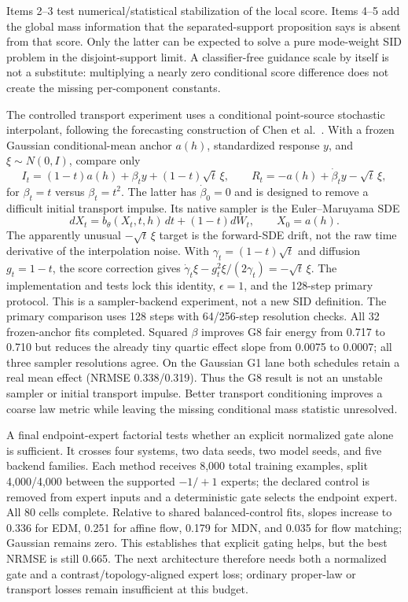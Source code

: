 \documentclass[10pt]{article}
\begin{document}
Items 2--3 test numerical/statistical stabilization of the local score.  Items
4--5 add the global mass information that the separated-support proposition says
is absent from that score.  Only the latter can be expected to solve a pure
mode-weight SID problem in the disjoint-support limit.  A classifier-free guidance
scale by itself is not a substitute: multiplying a nearly zero conditional score
difference does not create the missing per-component constants.

The controlled transport experiment uses a conditional point-source
stochastic interpolant, following the forecasting construction of Chen et
al.\ \cite{chen2024}.  With a frozen Gaussian conditional-mean anchor $a(h)$,
standardized response $y$, and $\xi\sim N(0,I)$, compare only
\[
 I_t=(1-t)a(h)+\beta_t y+(1-t)\sqrt t\,\xi,
 \qquad
 R_t=-a(h)+\dot\beta_t y-\sqrt t\,\xi,
\]
for $\beta_t=t$ versus $\beta_t=t^2$.  The latter has $\dot\beta_0=0$ and is
designed to remove a difficult initial transport impulse.  Its native sampler is
the Euler--Maruyama SDE
\[
 dX_t=b_\theta(X_t,t,h)\,dt+(1-t)dW_t,
 \qquad X_0=a(h).
\]
The apparently unusual $-\sqrt t\,\xi$ target is the forward-SDE drift, not the
raw time derivative of the interpolation noise.  With
$\gamma_t=(1-t)\sqrt t$ and diffusion $g_t=1-t$, the score correction gives
$\dot\gamma_t\xi-g_t^2\xi/(2\gamma_t)=-\sqrt t\,\xi$.  The implementation and
tests lock this identity, $\epsilon=1$, and the 128-step primary protocol.
This is a sampler-backend experiment, not a new SID definition.  The primary
comparison uses 128 steps with 64/256-step resolution checks.  All 32 frozen-anchor
fits completed.  Squared $\beta$ improves G8 fair energy from 0.717 to 0.710 but
reduces the already tiny quartic effect slope from 0.0075 to 0.0007; all three
sampler resolutions agree.  On the Gaussian G1 lane both schedules retain a real
mean effect (NRMSE 0.338/0.319).  Thus the G8 result is not an unstable sampler or
initial transport impulse.  Better transport conditioning improves a coarse law
metric while leaving the missing conditional mass statistic unresolved.

A final endpoint-expert factorial tests whether an explicit normalized gate alone
is sufficient.  It crosses four systems, two data seeds, two model seeds, and five
backend families.  Each method receives 8,000 total training examples, split
4,000/4,000 between the supported $-1/+1$ experts; the declared control is removed
from expert inputs and a deterministic gate selects the endpoint expert.  All 80
cells complete.  Relative to shared balanced-control fits, slopes increase to
0.336 for EDM, 0.251 for affine flow, 0.179 for MDN, and 0.035 for flow matching;
Gaussian remains zero.  This establishes that explicit gating helps, but the best
NRMSE is still 0.665.  The next architecture therefore needs both a normalized
gate and a contrast/topology-aligned expert loss; ordinary proper-law or transport
losses remain insufficient at this budget.
\end{document}
